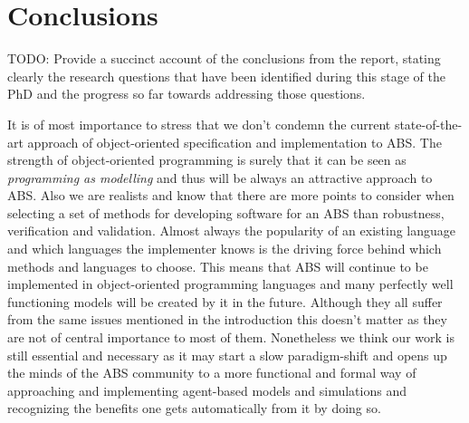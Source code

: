 \chapter{Conclusions}
TODO: Provide a succinct account of the conclusions from the report, stating clearly the research questions that have been identified during this stage of the PhD and the progress so far towards addressing those questions.

It is of most importance to stress that we don't condemn the current state-of-the-art approach of object-oriented specification and implementation to ABS. The strength of object-oriented programming is surely that it can be seen as \textit{programming as modelling} and thus will be always an attractive approach to ABS. Also we are realists and know that there are more points to consider when selecting a set of methods for developing software for an ABS than robustness, verification and validation. Almost always the popularity of an existing language and which languages the implementer knows is the driving force behind which methods and languages to choose. This means that ABS will continue to be implemented in object-oriented programming languages and many perfectly well functioning models will be created by it in the future. Although they all suffer from the same issues mentioned in the introduction this doesn't matter as they are not of central importance to most of them.
Nonetheless we think our work is still essential and necessary as it may start a slow paradigm-shift and opens up the minds of the ABS community to a more functional and formal way of approaching and implementing agent-based models and simulations and recognizing the benefits one gets automatically from it by doing so.
